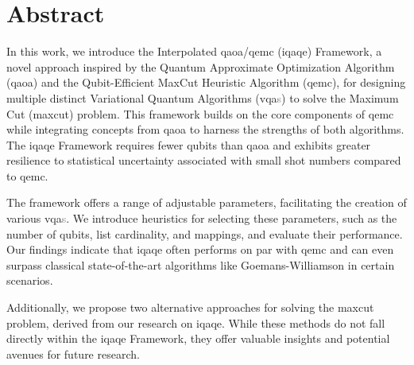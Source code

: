 
\section*{Abstract}



In this work, we introduce the Interpolated \acrshort{qaoa}/\acrshort{qemc} (\acrshort{iqaqe}) Framework, a novel approach inspired by the Quantum Approximate Optimization Algorithm (\acrshort{qaoa}) and the Qubit-Efficient MaxCut Heuristic Algorithm (\acrshort{qemc}), for designing multiple distinct Variational Quantum Algorithms (\acrshort{vqa}\textcolor{gray}{s}) to solve the Maximum Cut (\acrshort{maxcut}) problem. This framework builds on the core components of \acrshort{qemc} while integrating concepts from \acrshort{qaoa} to harness the strengths of both algorithms. The \acrshort{iqaqe} Framework requires fewer qubits than \acrshort{qaoa} and exhibits greater resilience to statistical uncertainty associated with small shot numbers compared to \acrshort{qemc}.

The framework offers a range of adjustable parameters, facilitating the creation of various \acrshort{vqa}\textcolor{gray}{s}. We introduce heuristics for selecting these parameters, such as the number of qubits, list cardinality, and mappings, and evaluate their performance. Our findings indicate that \acrshort{iqaqe} often performs on par with \acrshort{qemc} and can even surpass classical state-of-the-art algorithms like Goemans-Williamson in certain scenarios.

Additionally, we propose two alternative approaches for solving the \acrshort{maxcut} problem, derived from our research on \acrshort{iqaqe}. While these methods do not fall directly within the \acrshort{iqaqe} Framework, they offer valuable insights and potential avenues for future research.

